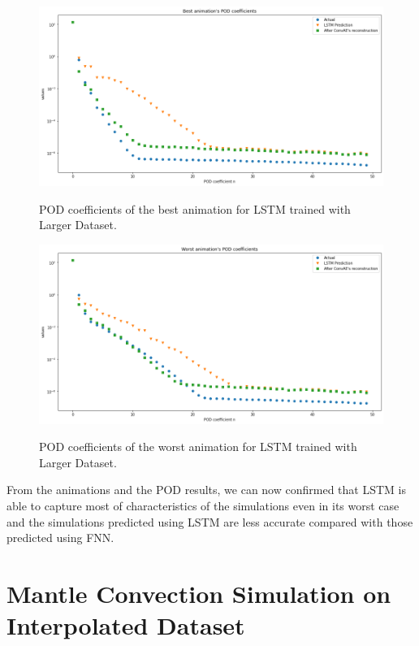 \begin{figure}[H]
    \centering
    \caption{POD coefficients of the best animation for LSTM trained with Larger Dataset.}
    \includegraphics[scale=0.4]{figures/mantle_convection_images/larger_dataset/LSTM_Best_POD.png}
    \label{figure:LSTM_larger_best_POD}
\end{figure}

\begin{figure}[H]
    \centering
    \caption{POD coefficients of the worst animation for LSTM trained with Larger Dataset.}
    \includegraphics[scale=0.4]{figures/mantle_convection_images/larger_dataset/LSTM_Worst_POD.png}
    \label{figure:LSTM_larger_worst_POD}
\end{figure}

From the animations and the POD results, we can now confirmed that LSTM is able to capture most of characteristics of the simulations even in its worst case and the simulations predicted using LSTM are less accurate compared with those predicted using FNN.


\section{Mantle Convection Simulation on Interpolated Dataset}

